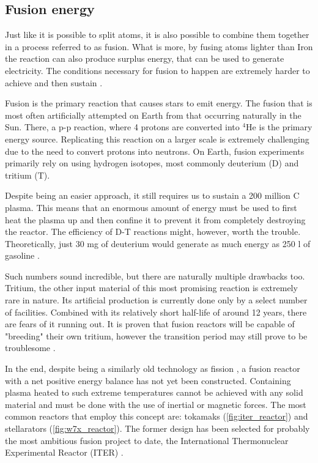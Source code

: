 \subsection{Fusion energy}

  Just like it is possible to split atoms, it is also possible to
  combine them together in a process referred to as fusion. 
  What is more, by fusing atoms lighter than Iron
  the reaction can also produce surplus energy,
  that can be used to generate electricity. 
  The conditions necessary for fusion to happen are 
  extremely harder to achieve and then sustain 
  \cite{structural_materials_fusion}.


  Fusion is the primary reaction that causes stars to emit energy.
  The fusion that is most often artificially attempted on Earth 
  from that occurring naturally in the Sun. There, a p-p reaction, 
  where 4 protons are converted into ${}^{4}$He is the primary energy source.
  Replicating this reaction on a larger scale is extremely challenging 
  due to the need to convert protons into neutrons.
  On Earth, fusion experiments primarily rely on using hydrogen isotopes, 
  most commonly deuterium (D) and tritium (T).


  Despite being an easier approach, it still requires us to sustain
  a 200 million \degree C plasma. This means that an enormous amount of energy
  must be used to first heat the plasma up and then confine it to 
  prevent it from completely destroying the reactor. 
  The efficiency of D-T reactions might, however, worth the trouble.
  Theoretically, just 30 mg of deuterium would generate as much energy
  as 250 l of gasoline \cite{nuclear_fusion_status}. 


  Such numbers sound incredible, but there are naturally multiple drawbacks too.
  Tritium, the other input material of this most promising reaction is
  extremely rare in nature. Its artificial production is currently 
  done only by a select number of facilities. 
  Combined with its relatively short half-life of around 12 years, 
  there are fears of it running out. It is proven that fusion reactors
  will be capable of "breeding" their own tritium, however the transition period 
  may still prove to be troublesome \cite{fusion_fuel_running_out}.


  In the end, despite being a similarly old technology as fission
  \cite{fusion_history},
  a fusion reactor with a net positive energy balance
  has not yet been constructed. Containing plasma heated to such extreme
  temperatures cannot be achieved with any solid material and must 
  be done with the use of inertial or magnetic forces. 
  The most common reactors that employ this concept are:
  tokamaks (\autoref{fig:iter_reactor}) 
  and stellarators (\autoref{fig:w7x_reactor}).
  The former design has been selected for probably
  the most ambitious fusion project to date, 
  the International Thermonuclear Experimental Reactor (ITER)
  \cite{nuclear_fusion_status}.

